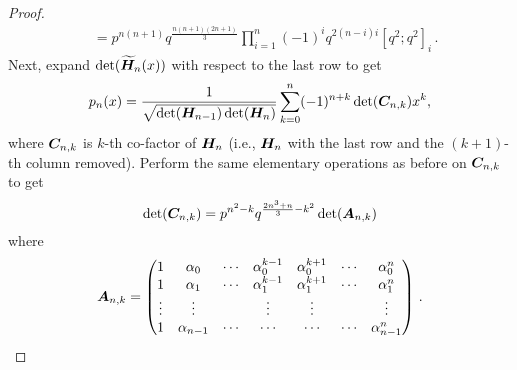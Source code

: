 \begin{subappendices}
\begin{proof}
\begin{align}
&= p^{n(n+1)} q^{\frac{n(n+1)(2n+1)}{3}}
\prod_{i=1}^{n} (-1)^i q^{2(n-i)i} [q^2; q^2]_i \,. \label{det_H}
\end{align}
Next, expand $\det(\widetilde{\bm{H}}_n(x))$ with respect to the last row to get
\begin{equation}\label{eq:PolynomialExpression1}
p_{n}(x)=\frac{1}{\sqrt{\det(\bm{H}_{n-1})\det(\bm{H}_n)}}\sum_{k=0}^{n}(-1)^{n+k} \det(\bm{C}_{n,k}) x^{k},
\end{equation}
where $\bm{C}_{n,k}$ is $k$-th co-factor of $\bm{H}_n$ (i.e., $\bm{H}_n$ with the last row and the $(k+1)$-th column removed). Perform the same elementary operations as before on $\bm{C}_{n,k}$ to get
\begin{equation} \label{cofactor_det}
\det(\bm{C}_{n,k})=p^{n^{2}-k}q^{\frac{2n^{3}+n}{3}-k^{2}} \det( \bm{A}_{n,k} )
\end{equation}
where
\[ \bm{A}_{n,k} = \begin{pmatrix}
1&\alpha_{0}&\cdots&\alpha_{0}^{k-1}&\alpha_{0}^{k+1}&\cdots&\alpha_{0}^{n} \\
1&\alpha_{1}&\cdots&\alpha_{1}^{k-1}&\alpha_{1}^{k+1}&\cdots&\alpha_{1}^{n}  \\
\vdots&\vdots& &\vdots&\vdots&&\vdots\\
1&\alpha_{n-1}&\cdots&\cdots&\cdots&\cdots&\alpha_{n-1}^{n}
\end{pmatrix}  \,. \]


\end{proof}
\end{subappendices}

